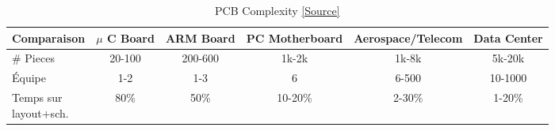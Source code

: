 \footnotesize{
\begin{table}
\caption{PCB Complexity \href{https://www.youtube.com/watch?v=I_MNw4EWer0&t=900s&ab_channel=RobertFeranec}{[Source]}}
\begin{tabular}{l|c|c|c|c|c}
\toprule
Comparaison & $\mu$ C\;  Board & ARM Board & PC Motherboard & Aerospace/Telecom & Data Center \\
\midrule
\hline
\# Pieces & 20-100 & 200-600 & 1k-2k & 1k-8k & 5k-20k \\
Équipe & 1-2 & 1-3 & 6 & 6-500 & 10-1000 \\
\makecell{Temps sur\\layout+sch.}  & 80\% & 50\% & 10-20\% & 2-30\% & 1-20\%\\
\bottomrule
\end{tabular}
\end{table}}